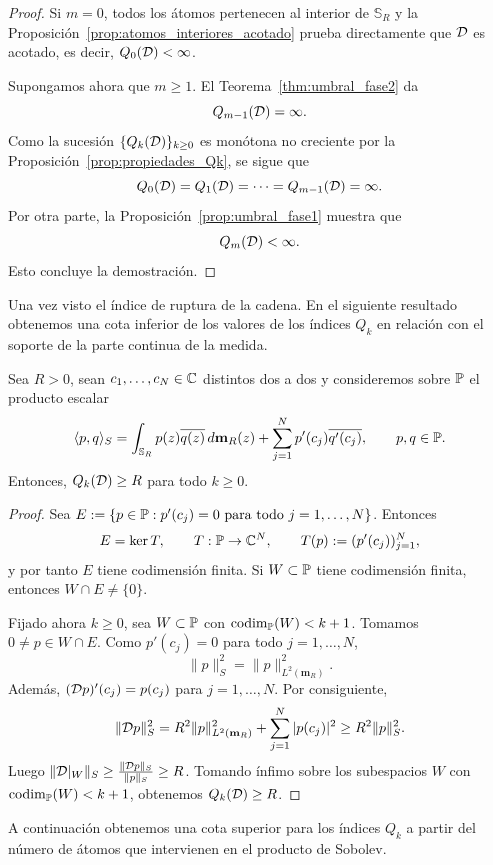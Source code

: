 \begin{proof}
	Si $m=0$, todos los átomos pertenecen al interior de $\mathbb{S}_R$ y la Proposición~\ref{prop:atomos_interiores_acotado} prueba directamente que $\mathcal{D}$ es acotado, es decir, $Q_0(\mathcal{D})<\infty$.

	Supongamos ahora que $m\ge1$. El Teorema~\ref{thm:umbral_fase2} da
	\[
		Q_{m-1}(\mathcal{D})=\infty.
	\]
	Como la sucesión $\{Q_k(\mathcal{D})\}_{k\ge0}$ es monótona no creciente por la Proposición~\ref{prop:propiedades_Qk}, se sigue que
	\[
		Q_0(\mathcal{D})=Q_1(\mathcal{D})=\cdots=Q_{m-1}(\mathcal{D})=\infty.
	\]
	Por otra parte, la Proposición~\ref{prop:umbral_fase1} muestra que
	\[
		Q_m(\mathcal{D})<\infty.
	\]
	Esto concluye la demostración.
\end{proof}

Una vez visto el índice de ruptura de la cadena. En el siguiente resultado obtenemos una cota inferior de los valores de los índices $Q_k$ en relación con el soporte de la parte continua de la medida.

\begin{prop}\label{prop:qk_general_cota_inferior_R}
	Sea $R>0$, sean $c_1,\dots,c_N\in\mathbb{C}$ distintos dos a dos y consideremos sobre $\mathbb{P}$ el producto escalar
	\[
		\langle p,q\rangle_S
		=
		\int_{\mathbb{S}_R}p(z)\overline{q(z)}\,d\mathbf{m}_R(z)
		+
		\sum_{j=1}^N p'(c_j)\overline{q'(c_j)},
		\qquad p,q\in\mathbb{P}.
	\]
	Entonces,
	\(
	Q_k(\mathcal{D})\ge R
	\) para todo $k\ge0$.
\end{prop}

\begin{proof}
	Sea $E:=\{p\in\mathbb{P}:p'(c_j)=0\text{ para todo }j=1,\dots,N\}$.
	Entonces
	\[
		E=\ker T,
		\qquad
		T:\mathbb{P}\to\mathbb{C}^{N},
		\qquad
		T(p):=(p'(c_j))_{j=1}^N,
	\]
	y por tanto $E$ tiene codimensión finita. Si $W\subset\mathbb{P}$ tiene codimensión finita, entonces $W\cap E\neq\{0\}$.

	Fijado ahora $k\ge0$, sea $W\subset\mathbb{P}$ con $\operatorname{codim}_{\mathbb{P}}(W)<k+1$.
	Tomamos $0\neq p\in W\cap E$. Como $p'(c_j)=0$ para todo $j=1,\dots,N$,
	\[
		\|p\|_S^2=\|p\|_{L^2(\mathbf{m}_R)}^2.
	\]
	Además, $(\mathcal{D} p)'(c_j)=p(c_j)$ para $j=1,\dots,N$.
	Por consiguiente,
	\[
		\|\mathcal{D} p\|_S^2
		=
		R^2\|p\|_{L^2(\mathbf{m}_R)}^2
		+
		\sum_{j=1}^N |p(c_j)|^2
		\ge
		R^2\|p\|_S^2.
	\]
	Luego $\|\mathcal{D}|_W\|_S\ge \frac{\|\mathcal{D} p\|_S}{\|p\|_S}\ge R$.
	Tomando ínfimo sobre los subespacios $W$ con $\operatorname{codim}_{\mathbb{P}}(W)<k+1$, obtenemos $Q_k(\mathcal{D})\ge R$.
\end{proof}

A continuación obtenemos una cota superior para los índices $Q_k$ a partir del número de átomos que intervienen en el producto de Sobolev.

